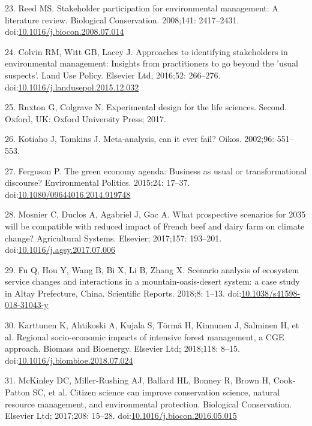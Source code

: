 \documentclass[10pt,letterpaper]{article}
\begin{document}
\hypertarget{ref-Reed2008}{}
23. Reed MS. Stakeholder participation for environmental management: A
literature review. Biological Conservation. 2008;141: 2417--2431.
doi:\href{https://doi.org/10.1016/j.biocon.2008.07.014}{10.1016/j.biocon.2008.07.014}

\hypertarget{ref-Colvin2016}{}
24. Colvin RM, Witt GB, Lacey J. Approaches to identifying stakeholders
in environmental management: Insights from practitioners to go beyond
the 'usual suspects'. Land Use Policy. Elsevier Ltd; 2016;52: 266--276.
doi:\href{https://doi.org/10.1016/j.landusepol.2015.12.032}{10.1016/j.landusepol.2015.12.032}

\hypertarget{ref-Ruxton2017}{}
25. Ruxton G, Colgrave N. Experimental design for the life sciences.
Second. Oxford, UK: Oxford University Press; 2017.

\hypertarget{ref-Kotiaho2002}{}
26. Kotiaho J, Tomkins J. Meta-analysis, can it ever fail? Oikos.
2002;96: 551--553.

\hypertarget{ref-Ferguson2015}{}
27. Ferguson P. The green economy agenda: Business as usual or
transformational discourse? Environmental Politics. 2015;24: 17--37.
doi:\href{https://doi.org/10.1080/09644016.2014.919748}{10.1080/09644016.2014.919748}

\hypertarget{ref-Mosnier2017}{}
28. Mosnier C, Duclos A, Agabriel J, Gac A. What prospective scenarios
for 2035 will be compatible with reduced impact of French beef and dairy
farm on climate change? Agricultural Systems. Elsevier; 2017;157:
193--201.
doi:\href{https://doi.org/10.1016/j.agsy.2017.07.006}{10.1016/j.agsy.2017.07.006}

\hypertarget{ref-Fu2018}{}
29. Fu Q, Hou Y, Wang B, Bi X, Li B, Zhang X. Scenario analysis of
ecosystem service changes and interactions in a mountain-oasis-desert
system: a case study in Altay Prefecture, China. Scientific Reports.
2018;8: 1--13.
doi:\href{https://doi.org/10.1038/s41598-018-31043-y}{10.1038/s41598-018-31043-y}

\hypertarget{ref-Karttunen2018}{}
30. Karttunen K, Ahtikoski A, Kujala S, Törmä H, Kinnunen J, Salminen H,
et al. Regional socio-economic impacts of intensive forest management, a
CGE approach. Biomass and Bioenergy. Elsevier Ltd; 2018;118: 8--15.
doi:\href{https://doi.org/10.1016/j.biombioe.2018.07.024}{10.1016/j.biombioe.2018.07.024}

\hypertarget{ref-McKinley2017}{}
31. McKinley DC, Miller-Rushing AJ, Ballard HL, Bonney R, Brown H,
Cook-Patton SC, et al. Citizen science can improve conservation science,
natural resource management, and environmental protection. Biological
Conservation. Elsevier Ltd; 2017;208: 15--28.
doi:\href{https://doi.org/10.1016/j.biocon.2016.05.015}{10.1016/j.biocon.2016.05.015}
\end{document}
